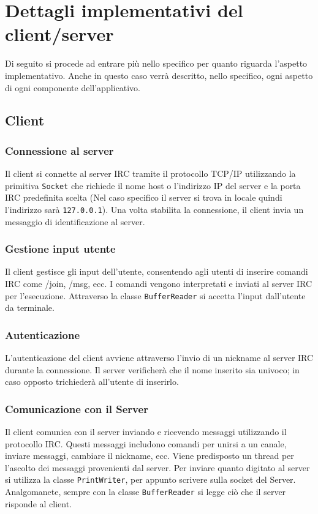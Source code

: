 \section{Dettagli implementativi del client/server}

Di seguito si procede ad entrare più nello specifico per quanto riguarda l'aspetto implementativo. Anche in questo caso verrà descritto, nello specifico, ogni aspetto di ogni componente dell'applicativo.

\subsection{Client}
\subsubsection{Connessione al server}
Il client si connette al server IRC tramite il protocollo TCP/IP utilizzando la primitiva \texttt{Socket} che richiede il nome host o l'indirizzo IP del server e la porta IRC predefinita scelta (Nel caso specifico il server si trova in locale quindi l'indirizzo sarà \texttt{127.0.0.1}). Una volta stabilita la connessione, il client invia un messaggio di identificazione al server.

\subsubsection{Gestione input utente}
Il client gestisce gli input dell'utente, consentendo agli utenti di inserire comandi IRC come /join, /msg, ecc. I comandi vengono interpretati e inviati al server IRC per l'esecuzione. Attraverso la classe \texttt{BufferReader} si accetta l'input dall'utente da terminale. 

\subsubsection{Autenticazione}
L'autenticazione del client avviene attraverso l'invio di un nickname al server IRC durante la connessione. Il server verificherà che il nome inserito sia univoco; in caso opposto trichiederà all'utente di inserirlo.

\subsubsection{Comunicazione con il Server}
Il client comunica con il server inviando e ricevendo messaggi utilizzando il protocollo IRC. Questi messaggi includono comandi per unirsi a un canale, inviare messaggi, cambiare il nickname, ecc. Viene predisposto un thread per l'ascolto dei messaggi provenienti dal server. Per inviare quanto digitato al server si utilizza la classe \texttt{PrintWriter}, per appunto scrivere sulla socket del Server. Analgomanete, sempre con la classe \texttt{BufferReader} si legge ciò che il server risponde al client.

